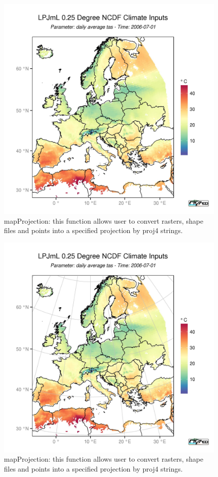 \documentclass[a4paper,10pt]{article}
\begin{document}
\begin{figure}
  \centering
    \includegraphics[width=1.2\textwidth]{projections}
  \caption{mapProjection: this function allows user to convert rasters, shape files and points into a 
	  specified projection by proj4 strings.}  
\end{figure}
\begin{figure}
  \centering
    \includegraphics[width=1.2\textwidth]{projection_with_graticules.jpeg}
  \caption{mapProjection: this function allows user to convert rasters, shape files and points into a 
	  specified projection by proj4 strings.}  
\end{figure}
\end{document}
